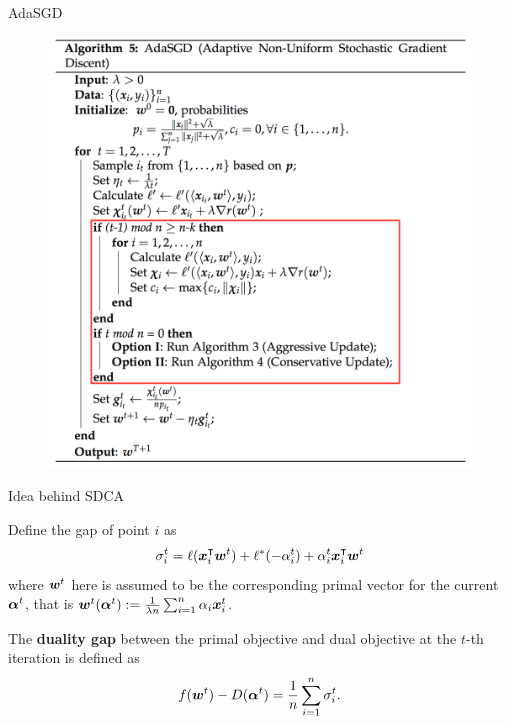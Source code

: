\begin{frame}{AdaSGD}
\begin{figure}[H]
        \includegraphics[height=0.8\textheight]{images/AdaSGD.png} 
    \label{fig:AdaSGD}
\end{figure}
\end{frame}

\begin{frame}{Idea behind SDCA}
\begin{definition}{Define the gap of point $i$ as} 
\[
\sigma_i^t =  \ell(\bm{x}_i^\intercal\bm{w}^{t})+\ell^*(-\alpha_i^{t})+\alpha_i^{t}\bm{x}_i^\intercal\bm{w}^{t} 
\]
where $\bm{w}^t$ here is assumed to be the corresponding primal vector for the current $\bm{\alpha}^t$, that is $\bm{w}^t(\bm{\alpha}^t) := \frac{1}{\lambda n}\sum_{i=1}^n \alpha_i \bm{x}_i^t$.
\end{definition}

The \textbf{duality gap} between the primal objective and dual objective at the $t$-th iteration is defined as
\[
    f(\bm{w}^{t})-D(\bm{\alpha}^{t}) = \frac{1}{n} \sum_{i=1}^n \sigma_i^t.
\]
\end{frame}

